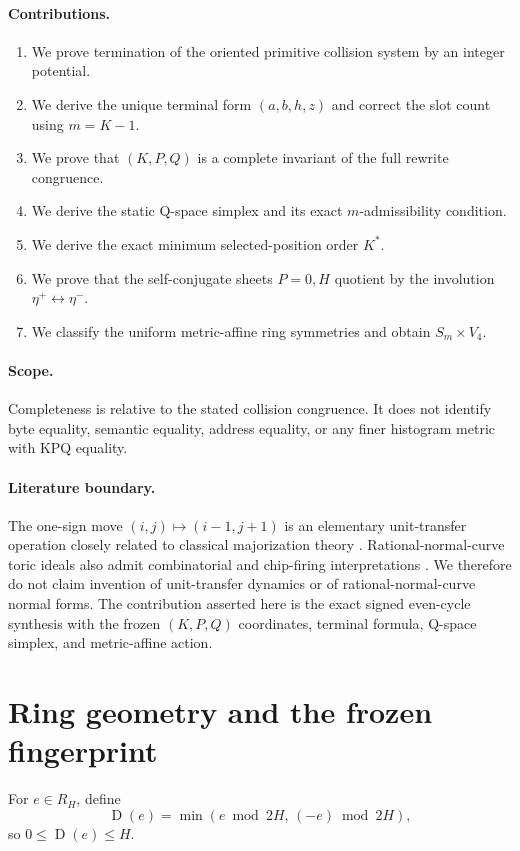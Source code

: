 \documentclass[11pt]{article}
\theoremstyle{definition}
\newcommand{\D}{\operatorname{D}}
\newcommand{\1}{\mathbf{1}}
\begin{document}
\paragraph{Contributions.}
\begin{enumerate}[leftmargin=*]
\item We prove termination of the oriented primitive collision system by an integer potential.
\item We derive the unique terminal form $(a,b,h,z)$ and correct the slot count using $m=K-1$.
\item We prove that $(K,P,Q)$ is a complete invariant of the full rewrite congruence.
\item We derive the static Q-space simplex and its exact $m$-admissibility condition.
\item We derive the exact minimum selected-position order $K^\ast$.
\item We prove that the self-conjugate sheets $P=0,H$ quotient by the involution $\eta^+\leftrightarrow\eta^-$.
\item We classify the uniform metric-affine ring symmetries and obtain $S_m\times V_4$.
\end{enumerate}

\paragraph{Scope.}
Completeness is relative to the stated collision congruence. It does not identify byte equality, semantic equality, address equality, or any finer histogram metric with KPQ equality.

\paragraph{Literature boundary.}
The one-sign move $(i,j)\mapsto(i-1,j+1)$ is an elementary unit-transfer operation closely related to classical majorization theory \cite{MarshallOlkinArnold2011}. Rational-normal-curve toric ideals also admit combinatorial and chip-firing interpretations \cite{KarkiManjunath2023}. We therefore do not claim invention of unit-transfer dynamics or of rational-normal-curve normal forms. The contribution asserted here is the exact signed even-cycle synthesis with the frozen $(K,P,Q)$ coordinates, terminal formula, Q-space simplex, and metric-affine action.

\section{Ring geometry and the frozen fingerprint}
For $e\in R_H$, define
\[
\D(e)=\min(e\bmod 2H,\,(-e)\bmod 2H),
\]
so $0\le \D(e)\le H$.
\end{document}
